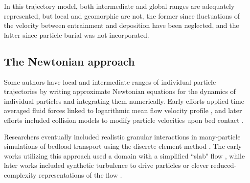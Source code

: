 In this trajectory model, both intermediate and global ranges are adequately represented, but local and geomorphic are not, the former since fluctuations of the velocity between entrainment and deposition have been neglected, and the latter since particle burial was not incorporated.

\subsection{The Newtonian approach}

Some authors have \DIFdelbegin {}\DIFdelend \DIFaddbegin {}\DIFaddend local and intermediate ranges of individual particle trajectories by writing approximate Newtonian equations for the dynamics of individual particles and integrating them numerically. Early efforts applied time-averaged fluid forces linked to \DIFdelbegin {}\DIFdelend \DIFaddbegin {}\DIFaddend logarithmic mean flow velocity profile \citep{Yalin1963,VanRijn1984}, and later efforts included collision models to modify particle velocities upon bed contact \citep{Wiberg1985,Sekine1992,Nino1998}.

Researchers eventually included realistic granular interactions in many-particle simulations of bedload transport using the discrete element method \DIFdelbegin {}\DIFdelend \DIFaddbegin {}\DIFaddend .
The early works utilizing this approach used a \DIFdelbegin {}\DIFdelend \DIFaddbegin {}\DIFaddend domain with a \DIFdelbegin {}\DIFdelend simplified ``slab" flow \DIFdelbegin {}\DIFdelend \DIFaddbegin {}\DIFaddend , while later works \DIFdelbegin {}\DIFdelend included synthetic turbulence to drive particles \DIFdelbegin {}\DIFdelend \DIFaddbegin {}\DIFaddend or clever reduced-complexity representations of the flow \citep{Clark2015,Clark2017}.

